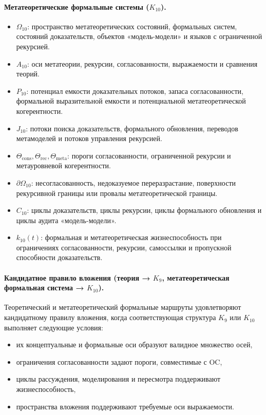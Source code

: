 \paragraph{Метатеоретические формальные системы (\texorpdfstring{$K_{10}$}{K10}).}
\begin{itemize}
  \item \(\Omega_{10}\): пространство метатеоретических состояний, формальных
        систем, состояний доказательств, объектов «модель-модели» и
        языков с ограниченной рекурсией.
  \item \(A_{10}\): оси метатеории, рекурсии, согласованности,
        выражаемости и сравнения теорий.
  \item \(P_{10}\): потенциал емкости доказательных потоков,
        запаса согласованности, формальной выразительной емкости и
        потенциальной метатеоретической когерентности.
  \item \(J_{10}\): потоки поиска доказательств, формального обновления,
        переводов метамоделей и потоков управления рекурсией.
  \item \(\Theta_{\mathrm{cons}}, \Theta_{\mathrm{rec}},
        \Theta_{\mathrm{meta}}\): пороги согласованности, ограниченной
        рекурсии и метауровневой когерентности.
  \item \(\partial\Omega_{10}\): несогласованность, недоказуемое
        переразрастание, поверхности рекурсивной границы или провалы
        метатеоретической границы.
  \item \(C_{10}\): циклы доказательств, циклы рекурсии,
        циклы формального обновления и циклы аудита «модель-модели».
  \item \(k_{10}(t)\): формальная и метатеоретическая жизнеспособность
        при ограничениях согласованности, рекурсии, самоссылки и пропускной
        способности доказательств.
\end{itemize}

\paragraph{Кандидатное правило вложения (теория →
            \texorpdfstring{$K_9$}{K9}, метатеоретическая формальная система →
            \texorpdfstring{$K_{10}$}{K10}).}
Теоретический и метатеоретический формальные маршруты удовлетворяют
кандидатному правилу вложения, когда соответствующая структура \(K_9\) или
\(K_{10}\) выполняет следующие условия:
\begin{itemize}
  \item их концептуальные и формальные оси образуют валидное множество осей,
  \item ограничения согласованности задают пороги, совместимые с OC,
  \item циклы рассуждения, моделирования и пересмотра поддерживают
        жизнеспособность,
  \item пространства вложения поддерживают требуемые оси выражаемости.
\end{itemize}

